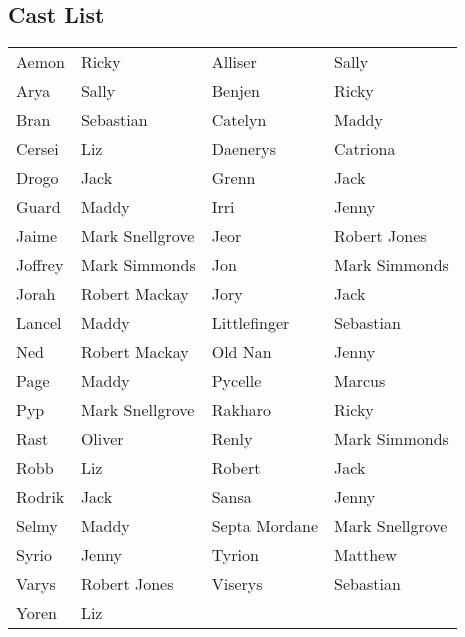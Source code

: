 \subsection*{Cast List}
\begin{tabular}{ll|ll}\\
Aemon & Ricky &  Alliser & Sally\\
Arya & Sally &  Benjen & Ricky\\
Bran & Sebastian &  Catelyn & Maddy\\
Cersei & Liz &  Daenerys & Catriona\\
Drogo & Jack &  Grenn & Jack\\
Guard & Maddy &  Irri & Jenny\\
Jaime & Mark Snellgrove &  Jeor & Robert Jones\\
Joffrey & Mark Simmonds &  Jon & Mark Simmonds\\
Jorah & Robert Mackay &  Jory & Jack\\
Lancel & Maddy &  Littlefinger & Sebastian\\
Ned & Robert Mackay &  Old Nan & Jenny\\
Page & Maddy &  Pycelle & Marcus\\
Pyp & Mark Snellgrove &  Rakharo & Ricky\\
Rast & Oliver &  Renly & Mark Simmonds\\
Robb & Liz &  Robert & Jack\\
Rodrik & Jack &  Sansa & Jenny\\
Selmy & Maddy &  Septa Mordane & Mark Snellgrove\\
Syrio & Jenny &  Tyrion & Matthew\\
Varys & Robert Jones &  Viserys & Sebastian\\
Yoren & Liz &  \end{tabular}
